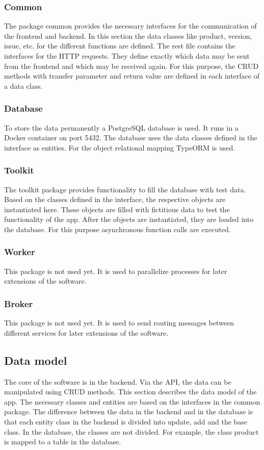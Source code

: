     \subsubsection*{Common}
    The package common provides the necessary interfaces for the communication of the frontend and backend. In this section the data classes like product, version, issue, etc. for the different functions are defined. 
    The rest file contains the interfaces for the HTTP requests. They define exactly which data may be sent from the frontend and which may be received again. For this purpose, the CRUD methods with transfer parameter and return value are defined in each interface of a data class.
    \subsubsection*{Database}
    To store the data permanently a PostgreSQL database is used. It runs in a Docker container on port 5432. The database uses the data classes defined in the interface as entities. For the object relational mapping TypeORM is used. 
    \subsubsection*{Toolkit}
    The toolkit package provides functionality to fill the database with test data. Based on the classes defined in the interface, the respective objects are instantiated here. These objects are filled with fictitious data to test the functionality of the app. After the objects are instantiated, they are loaded into the database. For this purpose asynchronous function calls are executed.
    \subsubsection*{Worker}
    This package is not used yet. It is used to parallelize processes for later extensions of the software.
    \subsubsection*{Broker}
    This package is not used yet. It is used to send routing messages between different services for later extensions of the software.

    \subsection*{Data model}
    The core of the software is in the backend. Via the API, the data can be manipulated using CRUD methods. This section describes the data model of the app. The necessary classes and entities are based on the interfaces in the common package. The difference between the data in the backend and in the database is that each entity class in the backend is divided into update, add and the base class. In the database, the classes are not divided. For example, the class product is mapped to a table in the database.
    
